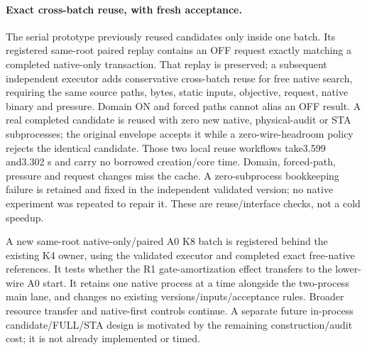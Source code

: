 \paragraph{Exact cross-batch reuse, with fresh acceptance.}
The serial prototype previously reused candidates only inside one batch. Its registered same-root paired replay contains an OFF request exactly matching a completed native-only transaction. That replay is preserved; a subsequent independent executor adds conservative cross-batch reuse for free native search, requiring the same source paths, bytes, static inputs, objective, request, native binary and pressure. Domain ON and forced paths cannot alias an OFF result. A real completed candidate is reused with zero new native, physical-audit or STA subprocesses; the original envelope accepts it while a zero-wire-headroom policy rejects the identical candidate. Those two local reuse workflows take3.599 and3.302 s and carry no borrowed creation/core time. Domain, forced-path, pressure and request changes miss the cache. A zero-subprocess bookkeeping failure is retained and fixed in the independent validated version; no native experiment was repeated to repair it. These are reuse/interface checks, not a cold speedup.

A new same-root native-only/paired A0 K8 batch is registered behind the existing K4 owner, using the validated executor and completed exact free-native references. It tests whether the R1 gate-amortization effect transfers to the lower-wire A0 start. It retains one native process at a time alongside the two-process main lane, and changes no existing versions/inputs/acceptance rules. Broader resource transfer and native-first controls continue. A separate future in-process candidate/FULL/STA design is motivated by the remaining construction/audit cost; it is not already implemented or timed.
